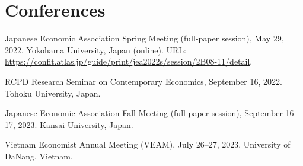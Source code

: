 \newcommand{\playsymbol}{$\blacktriangleright$}

\section{\sc Conferences}
\begin{etaremune}
\item
  Japanese Economic Association Spring Meeting (full-paper session), May 29, 2022. Yokohama University, Japan (online). URL: \url{https://confit.atlas.jp/guide/print/jea2022s/session/2B08-11/detail}.
\item 
  RCPD Research Seminar on Contemporary Economics, September 16, 2022. Tohoku University, Japan.
\item
  Japanese Economic Association Fall Meeting (full-paper session), September 16--17, 2023. Kansai University, Japan.
\item 
  Vietnam Economist Annual Meeting (VEAM), July 26--27, 2023. University of DaNang, Vietnam.
\end{etaremune}


